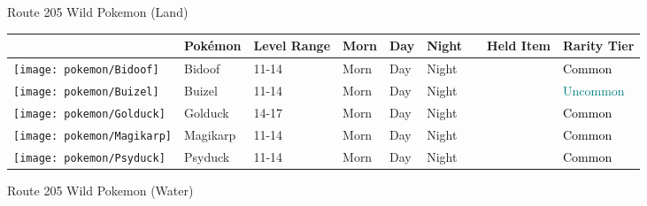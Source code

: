 \caption{Route 205 Wild Pokemon (Land)}%
\begin{longtable}{||l l l l l l l l l||}%
\hline%
&Pokémon&Level Range&Morn&Day&Night&&Held Item&Rarity Tier\\%
\hline%
\endhead%
\hline%
\texttt{[image: pokemon/Bidoof]}&Bidoof&11{-}14&Morn&Day&Night&&&\textcolor{black}{%
Common%
}\\%
\hline%
\texttt{[image: pokemon/Buizel]}&Buizel&11{-}14&Morn&Day&Night&&&\textcolor{teal}{%
Uncommon%
}\\%
\hline%
\texttt{[image: pokemon/Golduck]}&Golduck&14{-}17&Morn&Day&Night&&&\textcolor{black}{%
Common%
}\\%
\hline%
\texttt{[image: pokemon/Magikarp]}&Magikarp&11{-}14&Morn&Day&Night&&&\textcolor{black}{%
Common%
}\\%
\hline%
\texttt{[image: pokemon/Psyduck]}&Psyduck&11{-}14&Morn&Day&Night&&&\textcolor{black}{%
Common%
}\\%
\hline%
\end{longtable}%
\caption{Route 205 Wild Pokemon (Water)}